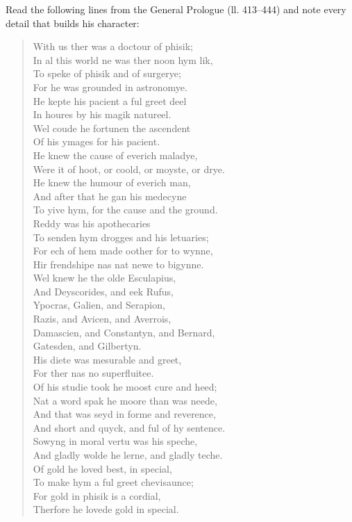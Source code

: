 \documentclass[11pt]{article}
\begin{document}
\begin{experience}
Read the following lines from the General Prologue (ll. 413–444) and note every detail that builds his character:
\begin{quote}
With us ther was a doctour of phisik; \\
In al this world ne was ther noon hym lik, \\
To speke of phisik and of surgerye; \\
For he was grounded in astronomye. \\
He kepte his pacient a ful greet deel \\
In houres by his magik natureel. \\
Wel coude he fortunen the ascendent \\
Of his ymages for his pacient. \\
He knew the cause of everich maladye, \\
Were it of hoot, or coold, or moyste, or drye. \\
He knew the humour of everich man, \\
And after that he gan his medecyne \\
To yive hym, for the cause and the ground. \\
Reddy was his apothecaries \\
To senden hym drogges and his letuaries; \\
For ech of hem made oother for to wynne, \\
Hir frendshipe nas nat newe to bigynne. \\
Wel knew he the olde Esculapius, \\
And Deyscorides, and eek Rufus, \\
Ypocras, Galien, and Serapion, \\
Razis, and Avicen, and Averrois, \\
Damascien, and Constantyn, and Bernard, \\
Gatesden, and Gilbertyn. \\
His diete was mesurable and greet, \\
For ther nas no superfluitee. \\
Of his studie took he moost cure and heed; \\
Nat a word spak he moore than was neede, \\
And that was seyd in forme and reverence, \\
And short and quyck, and ful of hy sentence. \\
Sowyng in moral vertu was his speche, \\
And gladly wolde he lerne, and gladly teche. \\
Of gold he loved best, in special, \\
To make hym a ful greet chevisaunce; \\
For gold in phisik is a cordial, \\
Therfore he lovede gold in special.
\end{quote}
\end{experience}
\end{document}
